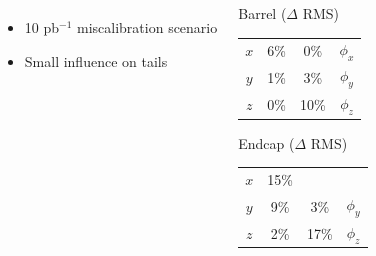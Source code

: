 \documentclass[compress]{beamer}
\begin{document}
\begin{frame}
\begin{columns}
\vspace{-1.2 cm}
\begin{itemize}
\item 10 pb$^{-1}$ miscalibration scenario
\item Small influence on tails
\end{itemize}

\begin{center}
Barrel ($\Delta$ RMS)

\vspace{0.05 cm}
\renewcommand{\arraystretch}{1.2}
\begin{tabular}{c c | c c}
\hline\hline
$x$ & 6\% & 0\% & $\phi_x$ \\
$y$ & 1\% & 3\% & $\phi_y$ \\
$z$ & 0\% & 10\% & $\phi_z$ \\
\hline\hline
\end{tabular}

\vspace{0.5 cm}
Endcap ($\Delta$ RMS)

\vspace{0.05 cm}
\renewcommand{\arraystretch}{1.2}
\begin{tabular}{c c | c c}
\hline\hline
$x$ & 15\% & & \\
$y$ & 9\% & 3\% & $\phi_y$ \\
$z$ & 2\% & 17\% & $\phi_z$ \\
\hline\hline
\end{tabular}
\end{center}
\end{columns}
\end{frame}
\end{document}
